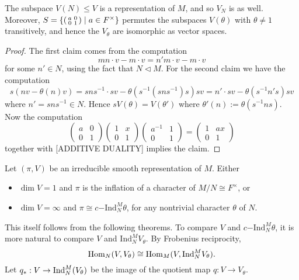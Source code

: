 \begin{lemma}\label{coinvariants}
	The subspace $V(N) \leq V$ is a representation of $M$, and so $V_N$ is as well. Moreover, $S = \{\begin{psmallmatrix}
        a&0\\0&1
    \end{psmallmatrix} \mid a \in F^\times\}$ permutes the subspaces $V(\theta)$ with $\theta \not= 1$ transitively, and hence the $V_\theta$ are isomorphic as vector spaces.
\end{lemma}
\begin{proof}
	The first claim comes from the computation 
	$$mn\cdot v - m\cdot v = n'm\cdot v - m\cdot v$$ for some $n' \in N$, using the fact that $N \lhd M$. For the second claim we have the computation
	\[s(nv - \theta(n)v) = sns^{-1}\cdot sv - \theta (s^{-1}(sns^{-1})s)sv = n'\cdot sv - \theta(s^{-1}n's) sv\]
	where $n' = sns^{-1}\in N$. Hence $sV(\theta) = V(\theta')$ where $\theta'(n) := \theta(s^{-1}ns)$. Now the computation
	\[\begin{pmatrix}
		a & 0 \\ 0 & 1
	\end{pmatrix}\begin{pmatrix}
		1 & x \\ 0 & 1
	\end{pmatrix}\begin{pmatrix}
		a^{-1} & 1 \\ 0 & 1
	\end{pmatrix} = \begin{pmatrix}
		1 & ax \\ 0 & 1
	\end{pmatrix}\]
	together with [ADDITIVE DUALITY] implies the claim.
\end{proof}



\begin{thm}\label{inf dim}
    Let $(\pi,V)$ be an irreducible smooth representation of $M$. Either 
    \begin{itemize}
        \item $\dim V=1$ and $\pi$ is the inflation of a character of $M/N \cong F^\times$, or
        \item $\dim V = \infty$ and $\pi \cong c\mathrm{-Ind}_N^M \theta$, for any nontrivial character $\theta$ of $N$.
    \end{itemize}
\end{thm}

This itself follows from the following theorems. To compare $V$ and $c\mathrm{-Ind}_N^M \theta$, it is more natural to compare $V$ and $\mathrm{Ind}_N^M V_\theta$. By Frobenius reciprocity,
$$\mathrm{Hom}_N(V,V_\theta) \cong \mathrm{Hom}_M(V,\mathrm{Ind}_N^M V_\theta).$$
Let $q_*: V \to \mathrm{Ind}_N^M(V_\theta)$ be the image of the quotient map $q: V \to V_\theta$.

